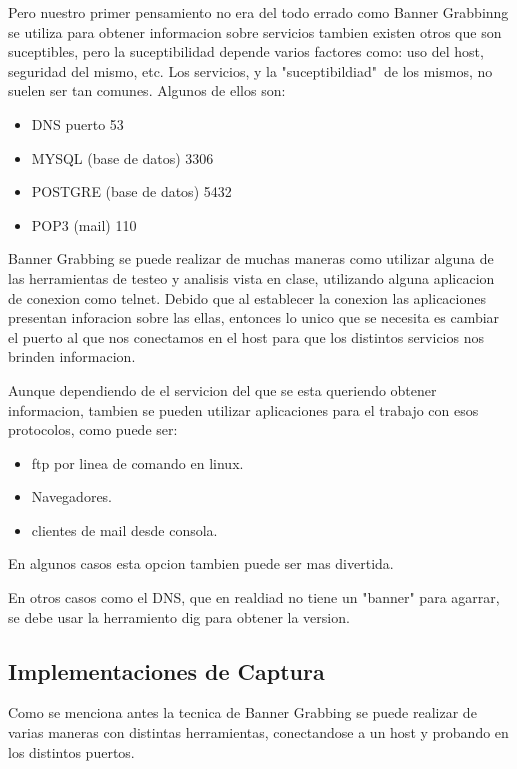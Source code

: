 \documentclass[a4paper]{article}
\begin{document}
Pero nuestro primer pensamiento no era del todo errado como Banner Grabbinng se utiliza para obtener informacion sobre servicios tambien existen otros que son suceptibles, pero la suceptibilidad depende
varios factores como: uso del host, seguridad del mismo, etc. Los servicios, y la "suceptibildiad"\ de los mismos, no suelen ser tan comunes. Algunos de ellos son:

\begin{itemize}

\item DNS puerto 53
\item MYSQL (base de datos) 3306
\item POSTGRE (base de datos) 5432
\item POP3 (mail) 110

\end{itemize}


Banner Grabbing se puede realizar de muchas maneras como utilizar alguna de las herramientas de testeo y analisis vista en clase, utilizando alguna aplicacion de conexion como telnet. Debido que al 
establecer la conexion las aplicaciones presentan inforacion sobre las ellas, entonces lo unico que se necesita es cambiar el puerto al que nos conectamos en el host para que los distintos servicios nos
brinden informacion.

Aunque dependiendo de el servicion del que se esta queriendo obtener informacion, tambien se pueden utilizar aplicaciones para el trabajo con esos protocolos, como puede ser:
\begin{itemize}
\item ftp por linea de comando en linux.
\item Navegadores.
\item clientes de mail desde consola.
 \end{itemize}
 
 En algunos casos esta opcion tambien puede ser mas divertida.
 
 En otros casos como el DNS, que en realdiad no tiene un "banner" para agarrar, se debe usar la herramiento dig para obtener la version.
 
\subsection{Implementaciones de Captura}
 
Como se menciona antes la tecnica de Banner Grabbing se puede realizar de varias maneras con distintas herramientas, conectandose a un host y probando en los distintos puertos.
\end{document}
